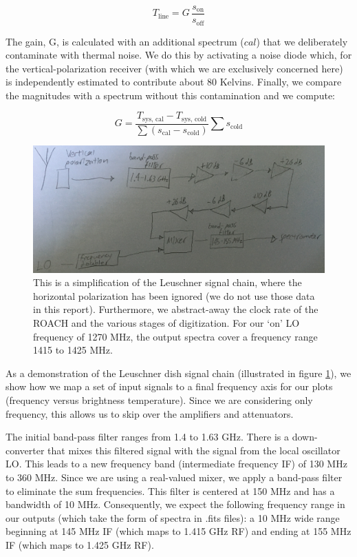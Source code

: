 \documentclass[12pt]{article}
\begin{document}
\begin{equation} \label{eq:line_shape}
T_\text{line} = G \, \frac{s_\text{on}}{s_\text{off}}
\end{equation}

The gain, G, is calculated with an additional spectrum ($cal$) that we deliberately contaminate with thermal noise. We do this by activating a noise diode which, for the vertical-polarization receiver (with which we are exclusively concerned here) is independently estimated to contribute about 80 Kelvins. Finally, we compare the magnitudes with a spectrum without this contamination and we compute:

\begin{equation} \label{eq:line_gain}
G = \frac{T_\text{sys, cal} - T_\text{sys, cold}}{\sum{(s_\text{cal} - s_\text{cold})}} \sum{s_\text{cold}}
\end{equation}

\begin{figure}
	\centering
	\includegraphics[width=.9\linewidth]{sig_chain}
	\caption{This is a simplification of the Leuschner signal chain, where the horizontal polarization has been ignored (we do not use those data in this report). Furthermore, we abstract-away the clock rate of the ROACH and the various stages of digitization. For our `on' LO frequency of 1270 MHz, the output spectra cover a frequency range 1415 to 1425 MHz.}
	\label{fig:sig_chain}
\end{figure}

As a demonstration of the Leuschner dish signal chain (illustrated in figure \ref{fig:sig_chain}), we show how we map a set of input signals to a final frequency axis for our plots (frequency versus brightness temperature). Since we are considering only frequency, this allows us to skip over the amplifiers and attenuators.

The initial band-pass filter ranges from 1.4 to 1.63 GHz. There is a down-converter that mixes this filtered signal with the signal from the local oscillator LO. This leads to a new frequency band (intermediate frequency IF) of 130 MHz to 360 MHz. Since we are using a real-valued mixer, we apply a band-pass filter to eliminate the sum frequencies. This filter is centered at 150 MHz and has a bandwidth of 10 MHz. Consequently, we expect the following frequency range in our outputs (which take the form of spectra in .fits files): a 10 MHz wide range beginning at 145 MHz IF (which maps to 1.415 GHz RF) and ending at 155 MHz IF (which maps to 1.425 GHz RF).
\end{document}
